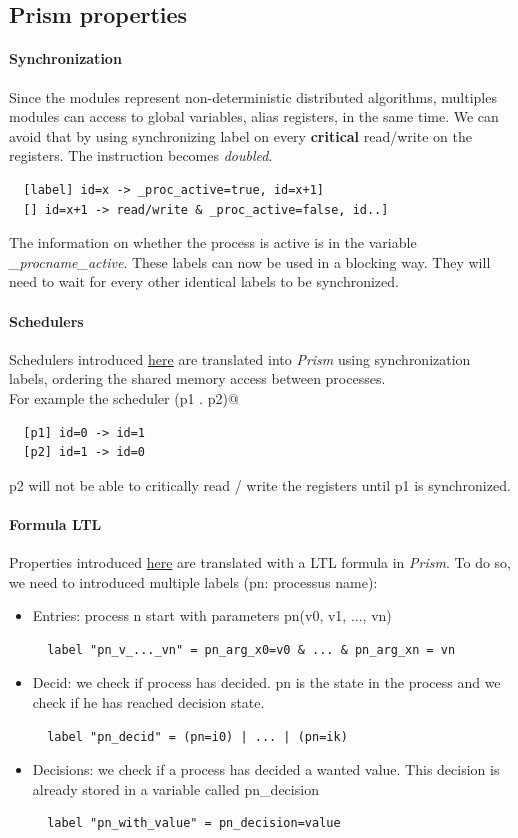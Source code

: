 \documentclass{article}
\begin{document}
\subsection{Prism properties}
\paragraph{Synchronization}
Since the modules represent non-deterministic distributed algorithms, multiples modules can access to global variables, alias registers, in the same time. We can avoid that by using synchronizing label on every \textbf{critical} read/write on the registers. The instruction becomes \textit{doubled}.
\begin{lstlisting}
  [label] id=x -> _proc_active=true, id=x+1]
  [] id=x+1 -> read/write & _proc_active=false, id..]
\end{lstlisting}
The information on whether the process is active is in the variable \textit{_procname_active}. These labels can now be used in a blocking way. They will need to wait for every other identical labels to be synchronized.

\paragraph{Schedulers}
Schedulers introduced \hyperref[sec:sch]{here} are translated into \textit{Prism} using synchronization labels, ordering the
shared memory access between processes.\\
For example the scheduler (p1 . p2)@
\begin{lstlisting}
  [p1] id=0 -> id=1
  [p2] id=1 -> id=0
\end{lstlisting}
p2 will not be able to critically read / write the registers until p1 is synchronized.

\paragraph{Formula LTL}
Properties introduced \hyperref[sec:pps]{here} are translated with a LTL formula in \textit{Prism}. To do so, we need to introduced multiple labels (pn: processus name):\\
\begin{itemize}
  \item{Entries: process n start with parameters pn(v0, v1, ..., vn) 
\begin{lstlisting}
  label "pn_v_..._vn" = pn_arg_x0=v0 & ... & pn_arg_xn = vn
\end{lstlisting}
  }
  \item{Decid: we check if process has decided. pn is the state in the process and we check if he has reached decision state.
\begin{lstlisting}
  label "pn_decid" = (pn=i0) | ... | (pn=ik)
\end{lstlisting}
  }
  \item{Decisions: we check if a process has decided a wanted value. This decision is already stored in a variable called pn_decision
\begin{lstlisting}
  label "pn_with_value" = pn_decision=value
\end{lstlisting}
}
\end{itemize}
\end{document}
